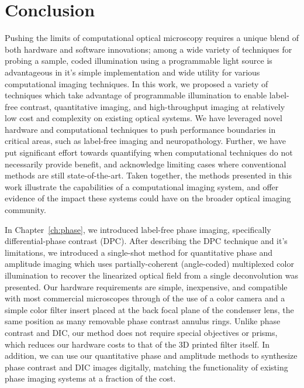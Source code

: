 \chapter{Conclusion}\label{ch:conclusion}
Pushing the limits of computational optical microscopy requires a unique blend of both hardware and software innovations; among a wide variety of techniques for probing a sample, coded illumination using a programmable light source is advantageous in it's simple implementation and wide utility for various computational imaging techniques. In this work, we proposed a variety of techniques which take advantage of programmable illumination to enable label-free contrast, quantitative imaging, and high-throughput imaging at relatively low cost and complexity on existing optical systems. We have leveraged novel hardware and computational techniques to push performance boundaries in critical areas, such as label-free imaging and neuropathology. Further, we have put significant effort towards quantifying when computational techniques do not necessarily provide benefit, and acknowledge limiting cases where conventional methods are still state-of-the-art. Taken together, the methods presented in this work illustrate the capabilities of a computational imaging system, and offer evidence of the impact these systems could have on the broader optical imaging community.

In Chapter~\ref{ch:phase}, we introduced label-free phase imaging, specifically differential-phase contrast (DPC). After describing the DPC technique and it's limitations, we introduced a single-shot method for quantitative phase and amplitude imaging which uses partially-coherent (angle-coded) multiplexed color illumination to recover the linearized optical field from a single deconvolution was presented. Our hardware requirements are simple, inexpensive, and compatible with most commercial microscopes through of the use of a color camera and a simple color filter insert placed at the back focal plane of the condenser lens, the same position as many removable phase contrast annulus rings. Unlike phase contrast and DIC, our method does not require special objectives or prisms, which reduces our hardware costs to that of the 3D printed filter itself. In addition, we can use our quantitative phase and amplitude methods to synthesize phase contrast and DIC images digitally, matching the functionality of existing phase imaging systems at a fraction of the cost.

